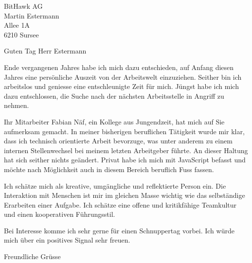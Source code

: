 \documentclass[
	pagenumber=false, 
	parskip=half, 
	fromalign=right, 
	foldmarks=true, 
	addrfield=true 
	]{scrlttr2}
\date{\today}
\begin{document}
\begin{letter}{BitHawk AG \\ Martin Estermann \\ Allee 1A \\ 6210 Sursee} 

\opening{Guten Tag Herr Estermann}

Ende vergangenen Jahres habe ich mich dazu entschieden, auf Anfang diesen Jahres eine persönliche Auszeit von der Arbeitswelt einzuziehen. Seither bin ich arbeitslos und geniesse eine entschleunigte Zeit für mich. Jüngst habe ich mich dazu entschlossen, die Suche nach der nächsten Arbeitsstelle in Angriff zu nehmen.

Ihr Mitarbeiter Fabian Näf, ein Kollege aus Jungendzeit, hat mich auf Sie aufmerksam gemacht. In meiner bisherigen beruflichen Tätigkeit wurde mir klar, dass ich technisch orientierte Arbeit bevorzuge, was unter anderem zu einem internen Stellenwechsel bei meinem letzten Arbeitgeber führte. An dieser Haltung hat sich seither nichts geändert. Privat habe ich mich mit JavaScript befasst und möchte nach Möglichkeit auch in diesem Bereich beruflich Fuss fassen.

Ich schätze mich als kreative, umgängliche und reflektierte Person ein. Die Interaktion mit Menschen ist mir im gleichen Masse wichtig wie das selbständige Erarbeiten einer Aufgabe. Ich schätze eine offene und kritikfähige Teamkultur und einen kooperativen Führungsstil.

Bei Interesse komme ich sehr gerne für einen Schnuppertag vorbei. Ich würde mich über ein positives Signal sehr freuen. 

\closing{Freundliche Grüsse}


\end{letter}
\end{document}
